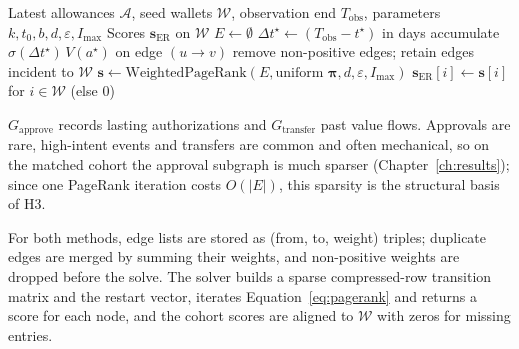\begin{algorithm}[htbp]
\caption{EndorseRank graph construction and scoring}
\label{alg:endorserank}
\begin{algorithmic}[1]
\Require Latest allowances $\mathcal{A}$, seed wallets $\mathcal{W}$, observation end $T_{\mathrm{obs}}$, parameters $k,t_0,b,d,\varepsilon,I_{\max}$
\Ensure Scores $\mathbf{s}_{\mathrm{ER}}$ on $\mathcal{W}$
\State $E \gets \emptyset$
  \State $\Delta t^{\star} \gets (T_{\mathrm{obs}}-t^{\star})$ in days
  \State accumulate $\sigma(\Delta t^{\star})\,V(a^{\star})$ on edge $(u\to v)$ 
\EndFor
\State remove non-positive edges; retain edges incident to $\mathcal{W}$
\State $\mathbf{s} \gets \mathrm{WeightedPageRank}(E, \text{uniform }\boldsymbol{\pi}, d, \varepsilon, I_{\max})$ 
\State \Return $\mathbf{s}_{\mathrm{ER}}[i] \gets \mathbf{s}[i]$ for $i\in\mathcal{W}$ (else $0$)
\end{algorithmic}
\end{algorithm}

$G_{\text{approve}}$ records lasting authorizations and $G_{\text{transfer}}$ past value flows. Approvals are rare, high-intent events and transfers are common and often mechanical, so on the matched cohort the approval subgraph is much sparser (Chapter~\ref{ch:results}); since one PageRank iteration costs $O(|E|)$, this sparsity is the structural basis of H3.

For both methods, edge lists are stored as (from, to, weight) triples; duplicate edges are merged by summing their weights, and non-positive weights are dropped before the solve. The solver builds a sparse compressed-row transition matrix and the restart vector, iterates Equation~\eqref{eq:pagerank} and returns a score for each node, and the cohort scores are aligned to $\mathcal{W}$ with zeros for missing entries.


